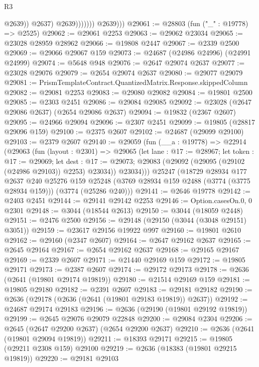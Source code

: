 \begin{lexlean}{R3}
\begin{coremodule}
                              @2639))
                          @2637)
                        @2639)))))))
          @2639)))
@29061 := @28803 (fun ("_" : @19778) => @2525)
@29062 := @29061 @2253
@29063 := @29062 @23034
@29065 := @23028 @28959 @28962
@29066 := @19808 @2447
@29067 := @2339 @2500
@29069 := @29066 @29067 @159
@29073 := @24687 (@24986 @24996) (@24991 @24999)
@29074 := @5648 @948
@29076 := @2647 @29074 @2637
@29077 := @23028 @29076
@29079 := @2654 @29074 @2637
@29080 := @29077 @29079
@29081 := PrismTemplateContract.QuantizedMatrix.Response.skippedColumn
@29082 := @29081 @2253
@29083 := @29080 @29082
@29084 := @19801 @2500
@29085 := @2303 @2451
@29086 := @29084 @29085
@29092 := @23028 (@2647 @29086 @2637) (@2654 @29086 @2637)
@29094 := @19832 (@2367 @2607)
@29095 := @24966 @29094
@29096 := @2307 @2451
@29099 := @19805 (@28817 @29096 @159)
@29100 := @2375 @2607
@29102 := @24687 (@29099 @29100)
@29103 := @2379 @2607
@29140 := @29059
    (fun (__a : @19778) =>
    @22914
      (@29063
        (fun (layout : @2301) =>
        @29065
          (let lane : @17 := @28967;
          let token : @17 := @29069;
          let dest : @17 := @29073; @29083 (@29092 (@29095 (@29102 (@24986 @29103)) @2253) @23034))
          @23034)))
    @25247
    (@18729
      @28934
      @177
      @2637
      @240
      @25276
      @159
      @25248
      (@3769 @28934 @159 @2488 (@3774 (@3775 @28934 @159)))
      (@3774 (@25286 @240)))
@29141 := @2646 @19778
@29142 := @2403 @2451
@29144 := @29141 @29142 @2253
@29146 := Option.casesOn.{0, 0} @2301
@29148 := @3044 (@18544 @2613)
@29150 := @3044 (@18059 @2448)
@29151 := @2476 @2500
@29156 := @29148 (@29150 (@3044 (@3048 @29151) @3051))
@29159 := @23617 @29156 @19922 @997
@29160 := @19801 @2610
@29162 := @29160 (@2347 @2607)
@29164 := @2647 @29162 @2637
@29165 := @2645 @29164
@29167 := @2654 @29162 @2637
@29168 := @29165 @29167
@29169 := @2339 @2607
@29171 := @21440 @29169 @159
@29172 := @19805 @29171
@29173 := @2387 @2607
@29174 := @29172 @29173
@29178 := @2636 (@2641 (@19801 @29174 @19819))
@29180 := @21514 @29169 @159
@29181 := @19805 @29180
@29182 := @2391 @2607
@29183 := @29181 @29182
@29190 := @2636 (@29178 (@2636 (@2641 (@19801 @29183 @19819)) @2637))
@29192 := @24687 @29174 @29183
@29196 := @2636 (@29190 (@19801 @29192 @19819))
@29199 := @2645 @29076 @29079 @22848
@29200 := @29084 @2304
@29206 := @2645 (@2647 @29200 @2637) (@2654 @29200 @2637)
@29210 := @2636 (@2641 (@19801 @29094 @19819))
@29211 := @18393 @29171
@29215 := @19805 (@29211 @2308 @159) @29100
@29219 := @2636 (@18383 (@19801 @29215 @19819))
@29220 := @29181 @29103

\end{coremodule}
\end{lexlean}
